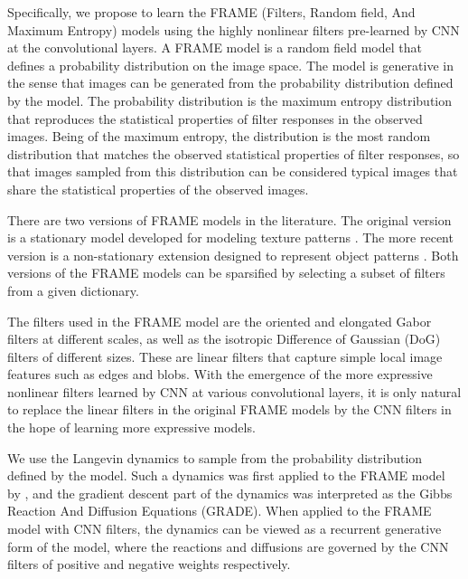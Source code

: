 \documentclass[letterpaper]{article}
\begin{document}
 Specifically, we propose to learn the FRAME (Filters, Random field, And Maximum Entropy) models \citep{zhu1997minimax, xie2014learning} using the highly  nonlinear filters pre-learned by CNN at the convolutional layers. A FRAME model is a random field model that defines a probability distribution on the image space. The model is generative in the sense that images can be generated from the probability distribution defined by the  model. The probability distribution is the maximum entropy distribution that reproduces the statistical properties of filter responses in the observed images. Being of the maximum entropy, the distribution is the most random distribution that matches the observed statistical properties of filter responses, so that images sampled from this distribution can be considered typical images that share the statistical properties of the observed images. 
 
There are two versions of FRAME models in the literature. The original version is a stationary model developed for modeling texture patterns \citep{zhu1997minimax}. The more recent version is a non-stationary extension designed to represent object patterns  \citep{xie2014learning}. Both versions of the FRAME models can be sparsified by selecting a subset of filters from a given dictionary. 

The filters used in the FRAME model are the oriented and elongated Gabor filters at different scales, as well as the isotropic Difference of Gaussian (DoG) filters of different sizes. These are linear filters that capture simple local image features such as edges and blobs. With the emergence of the more expressive nonlinear filters learned by CNN at various convolutional layers, it is only natural to replace the linear filters in the original FRAME models by the CNN filters in the hope of learning more expressive models. 

 We use the Langevin dynamics to sample from the probability distribution defined by the model.  Such a dynamics was first applied to the FRAME model  by \cite{zhu1997GRADE}, and the gradient descent part of the dynamics was interpreted as the Gibbs Reaction And Diffusion Equations (GRADE). When applied to the FRAME model with CNN filters, the dynamics can be viewed as a recurrent generative form of the model, where the reactions and diffusions are governed by the CNN filters of positive and negative weights respectively. 
    
\end{document}
